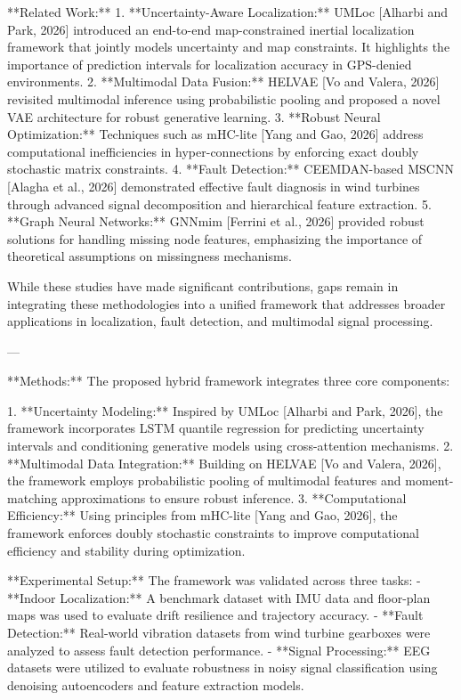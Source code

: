 **Related Work:**  
1. **Uncertainty-Aware Localization:** UMLoc [Alharbi and Park, 2026] introduced an end-to-end map-constrained inertial localization framework that jointly models uncertainty and map constraints. It highlights the importance of prediction intervals for localization accuracy in GPS-denied environments.  
2. **Multimodal Data Fusion:** HELVAE [Vo and Valera, 2026] revisited multimodal inference using probabilistic pooling and proposed a novel VAE architecture for robust generative learning.  
3. **Robust Neural Optimization:** Techniques such as mHC-lite [Yang and Gao, 2026] address computational inefficiencies in hyper-connections by enforcing exact doubly stochastic matrix constraints.  
4. **Fault Detection:** CEEMDAN-based MSCNN [Alagha et al., 2026] demonstrated effective fault diagnosis in wind turbines through advanced signal decomposition and hierarchical feature extraction.  
5. **Graph Neural Networks:** GNNmim [Ferrini et al., 2026] provided robust solutions for handling missing node features, emphasizing the importance of theoretical assumptions on missingness mechanisms.  

While these studies have made significant contributions, gaps remain in integrating these methodologies into a unified framework that addresses broader applications in localization, fault detection, and multimodal signal processing.  

---

**Methods:**  
The proposed hybrid framework integrates three core components:  

1. **Uncertainty Modeling:** Inspired by UMLoc [Alharbi and Park, 2026], the framework incorporates LSTM quantile regression for predicting uncertainty intervals and conditioning generative models using cross-attention mechanisms.  
2. **Multimodal Data Integration:** Building on HELVAE [Vo and Valera, 2026], the framework employs probabilistic pooling of multimodal features and moment-matching approximations to ensure robust inference.  
3. **Computational Efficiency:** Using principles from mHC-lite [Yang and Gao, 2026], the framework enforces doubly stochastic constraints to improve computational efficiency and stability during optimization.  

**Experimental Setup:**  
The framework was validated across three tasks:  
- **Indoor Localization:** A benchmark dataset with IMU data and floor-plan maps was used to evaluate drift resilience and trajectory accuracy.  
- **Fault Detection:** Real-world vibration datasets from wind turbine gearboxes were analyzed to assess fault detection performance.  
- **Signal Processing:** EEG datasets were utilized to evaluate robustness in noisy signal classification using denoising autoencoders and feature extraction models.  


